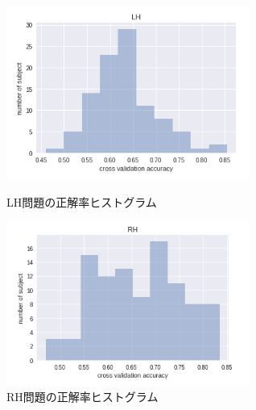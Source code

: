 \begin{figure}[t]
    \begin{minipage}{0.5\hsize}
     \begin{center}
      \includegraphics[width=80mm]{images/LH.png}
     \end{center}
     \caption{LH問題の正解率ヒストグラム}
     \label{fig:LHhist}
    \end{minipage}
    \begin{minipage}{0.5\hsize}
     \begin{center}
      \includegraphics[width=80mm]{images/RH.png}
     \end{center}
     \caption{RH問題の正解率ヒストグラム}
     \label{fig:RHhist}
    \end{minipage}
\end{figure}
